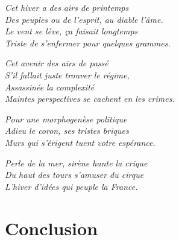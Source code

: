



\vfill

\stars

{\raggedleft
\textit{
Cet hiver a des airs de printemps\\
Des peuples ou de l'esprit, au diable l'âme.\\
Le vent se lève, ça faisait longtemps\\
Triste de s'enfermer pour quelques grammes.\\
}
}
\medskip

{\raggedright

\textit{
Cet avenir des airs de passé\\
S'il fallait juste trouver le régime,\\
Assassinée la complexité\\
Maintes perspectives se cachent en les crimes.\\
}
}

\medskip
{\raggedleft

\textit{
Pour une morphogenèse politique\\
Adieu le coron, ses tristes briques\\
Murs qui s'érigent tuent votre espérance.\\
}
}

\medskip
{\raggedright


\textit{
Perle de la mer, sirène hante la crique\\
Du haut des tours s'amuser du cirque\\
L'hiver d'idées qui peuple la France.\\
}
}

\stars

\vfill






\newpage






\chapter*{Conclusion}




